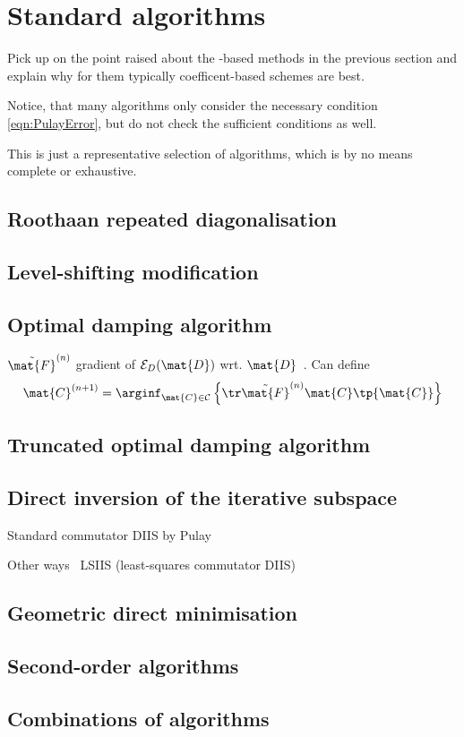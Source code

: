\section{Standard \SCF algorithms}
\label{sec:SCFAlgorithms}

Pick up on the point raised about the \contraction-based
methods in the previous section
and explain why for them typically
coefficent-based \SCF schemes are best.





Notice, that many \SCF algorithms only consider the necessary condition \eqref{eqn:PulayError},
but do not check the sufficient conditions as well.


This is just a representative selection of algorithms,
which is by no means complete or exhaustive.

\subsection{Roothaan repeated diagonalisation}
\label{sec:RoothaanRepeatedDiag}

\subsection{Level-shifting modification}

\subsection{Optimal damping algorithm}
\label{sec:ODA}
$\tilde{\mat{F}}^{(n)}$ gradient of $\mathcal{E}_D(\mat{D})$
wrt. $\mat{D}$~\cite{Lions1988,Cances2000}.
Can define~\cite{Lions1988,Cances2000}
\[
	\mat{C}^{(n+1)} = \arginf_{\mat{C} \in \mathcal{C}}
\left\{ \tr \tilde{\mat{F}}^{(n)} \mat{C} \tp{\mat{C}} \right\} \]

\subsection{Truncated optimal damping algorithm}

\subsection{Direct inversion of the iterative subspace}

Standard commutator DIIS by Pulay

Other ways~\cite{Shepard2007}
LSIIS (least-squares commutator DIIS)~\cite{Li2016}

\subsection{Geometric direct minimisation}

\subsection{Second-order \SCF algorithms}

\subsection{Combinations of algorithms}
